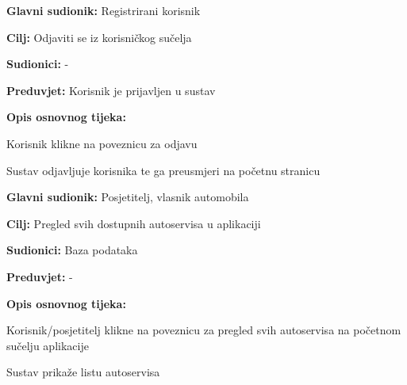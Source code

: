 \noindent {}
\begin{packed_item}
	
	\item \textbf{Glavni sudionik: } Registrirani korisnik
	\item  \textbf{Cilj:} Odjaviti se iz korisničkog sučelja
	\item  \textbf{Sudionici:} -
	\item  \textbf{Preduvjet:} Korisnik je prijavljen u sustav
	\item  \textbf{Opis osnovnog tijeka:}
	
	\item[] \begin{packed_enum}
		
		\item Korisnik klikne na poveznicu za odjavu
		\item Sustav odjavljuje korisnika te ga preusmjeri na početnu stranicu
	\end{packed_enum}
	
\end{packed_item}

\noindent {}
\begin{packed_item}
	
	\item \textbf{Glavni sudionik: } Posjetitelj, vlasnik automobila
	\item  \textbf{Cilj:} Pregled svih dostupnih autoservisa u aplikaciji
	\item  \textbf{Sudionici:} Baza podataka
	\item  \textbf{Preduvjet:} -
	\item  \textbf{Opis osnovnog tijeka:}
	
	\item[] \begin{packed_enum}
		
		\item Korisnik/posjetitelj klikne na poveznicu za pregled svih
		autoservisa na početnom sučelju aplikacije
		\item Sustav prikaže listu autoservisa
	\end{packed_enum}
	
\end{packed_item}

